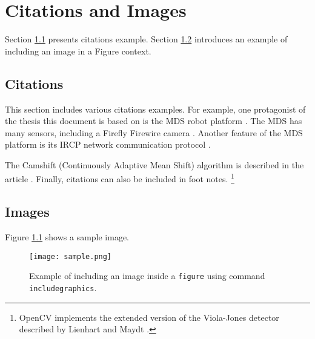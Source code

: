 \chapter{Citations and Images} \label{citationsandimages}

Section \ref{citations} presents citations example. Section \ref{images} introduces an example of including
an image in a Figure context.

\section{Citations} \label{citations}

This section includes various citations examples. For example, one protagonist of the thesis this document
is based on is the MDS robot platform \cite{MDS}. The MDS has many sensors, including a Firefly Firewire
camera \cite{FireflyDatasheet}. Another feature of the MDS platform is its IRCP network communication
protocol \cite{IRCP}.

The Camshift (Continuously Adaptive Mean Shift) algorithm
is described in the article \cite{BradskiCamshift}. Finally, citations can also be included in foot notes. 
\footnote{OpenCV \cite{Bradski} implements the extended version of the Viola-Jones detector described by
Lienhart and Maydt \cite{Lienhart}.}

\section{Images} \label{images}

Figure \ref{imageexample} shows a sample image.

\begin{figure}[t]
\center
\texttt{[image: sample.png]}
\caption[Example of a figure with an image]{Example of including an image inside a \texttt{figure} using command \texttt{includegraphics}.}
\label{imageexample}
\end{figure}